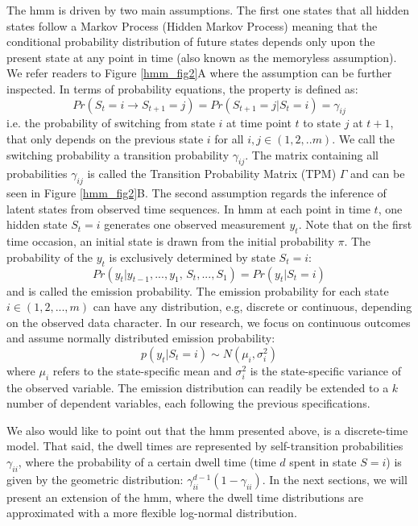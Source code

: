 The \ac{hmm} is driven by two main assumptions. The first one states that all hidden states follow a Markov Process (Hidden Markov Process) meaning that the conditional probability distribution of future states depends only upon the present state at any point in time (also known as the memoryless assumption). We refer readers to Figure \ref{hmm_fig2}A where the assumption can be further inspected. In terms of probability equations, the property is defined as: 
\begin{equation}
 Pr(S_t=i \rightarrow S_{t+1}=j)=Pr(S_{t+1}=j|S_{t}=i)=\gamma_{ij}
 \label{ee1}
\end{equation}
i.e. the probability of switching from state $i$ at time point $t$ to state $j$ at $t+1$, that only depends on the previous state $i$ for all ${i,j \in (1,2,..m)}$. We call the switching probability a transition probability $\gamma_{ij}$. The matrix containing all probabilities $\gamma_{ij}$ is called the Transition Probability Matrix (TPM) $\Gamma$ and can be seen in Figure \ref{hmm_fig2}B.
The second assumption regards the inference of latent states from observed time sequences. In \ac{hmm} at each point in time $t$, one hidden state $S_t=i$ generates one observed measurement $y_t$. Note that on the first time occasion, an initial state is drawn from the initial probability $\pi$. The probability of the $y_t$ is exclusively determined by state ${S_t=i}$: 
\begin{equation}
 Pr(y_t|y_{t-1},...,y_1, \, S_t,...,S_1)=Pr(y_t|S_t=i)
 \label{e2}
\end{equation} 
and is called the emission probability. The emission probability for each state ${i\in (1,2,...,m)}$ can have any distribution, e.g, discrete or continuous, depending on the observed data character. In our research, we focus on continuous outcomes and assume normally distributed emission probability:
\begin{equation}\label{e5}
 p(y_{t}|S_t=i)\sim N(\mu_{i},\sigma^{2}_{i})
\end{equation}
where $\mu_i$ refers to the state-specific mean and $\sigma^{2}_{i}$ is the state-specific variance of the observed variable. The emission distribution can readily be extended to a $k$ number of dependent variables, each following the previous specifications. 

We also would like to point out that the \ac{hmm} presented above, is a discrete-time model. That said, the dwell times are represented by self-transition probabilities $\gamma_{ii}$, where the probability of a certain dwell time (time $d$ spent in state $S=i$) is given by the geometric distribution: ${\gamma_{ii}^{d-1}(1-\gamma_{ii})}$. In the next sections, we will present an extension of the \ac{hmm}, where the dwell time distributions are approximated with a more flexible log-normal distribution.

